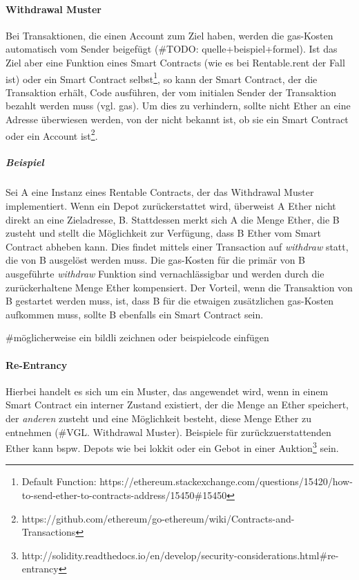\paragraph{Withdrawal Muster}
Bei Transaktionen, die einen Account zum Ziel haben, werden die gas-Kosten automatisch vom Sender beigefügt (\#TODO: quelle+beispiel+formel). Ist das Ziel aber eine Funktion eines Smart Contracts (wie es bei Rentable.rent der Fall ist) oder ein Smart Contract selbst\footnote{Default Function: https://ethereum.stackexchange.com/questions/15420/how-to-send-ether-to-contracts-address/15450\#15450}, so kann der Smart Contract, der die Transaktion erhält, Code ausführen, der vom initialen Sender der Transaktion bezahlt werden muss (vgl. gas). Um dies zu verhindern, sollte nicht Ether an eine Adresse überwiesen werden, von der nicht bekannt ist, ob sie ein Smart Contract oder ein Account ist\footnote{https://github.com/ethereum/go-ethereum/wiki/Contracts-and-Transactions}.

\subparagraph{Beispiel}
Sei A eine Instanz eines Rentable Contracts, der das Withdrawal Muster implementiert. Wenn ein Depot zurückerstattet wird, überweist A Ether nicht direkt an eine Zieladresse, B. Stattdessen merkt sich A die Menge Ether, die B zusteht und stellt die Möglichkeit zur Verfügung, dass B Ether vom Smart Contract abheben kann. Dies findet mittels einer Transaction auf \emph{withdraw} statt, die von B ausgelöst werden muss. Die gas-Kosten für die primär von B ausgeführte \emph{withdraw} Funktion sind vernachlässigbar und werden durch die zurückerhaltene Menge Ether kompensiert. Der Vorteil, wenn die Transaktion von B gestartet werden muss, ist, dass B für die etwaigen zusätzlichen gas-Kosten aufkommen muss, sollte B ebenfalls ein Smart Contract sein. 

\#möglicherweise ein bildli zeichnen oder beispielcode einfügen

\paragraph{Re-Entrancy}
Hierbei handelt es sich um ein Muster, das angewendet wird, wenn in einem Smart Contract ein interner Zustand existiert, der die Menge an Ether speichert, der \emph{anderen} zusteht und eine Möglichkeit besteht, diese Menge Ether zu entnehmen (\#VGL. Withdrawal Muster). Beispiele für zurückzuerstattenden Ether kann bspw. Depots wie bei lokkit oder ein Gebot in einer Auktion\footnote{http://solidity.readthedocs.io/en/develop/security-considerations.html\#re-entrancy} sein.

